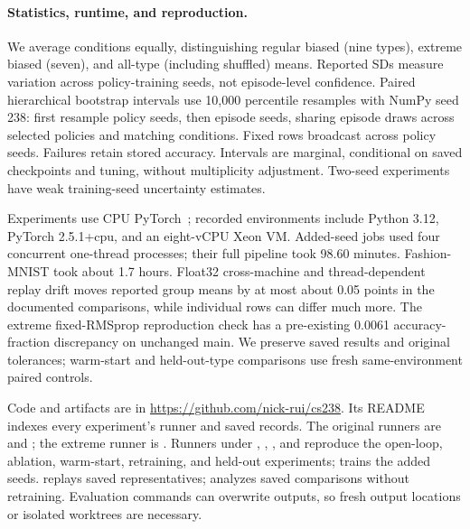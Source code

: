 \documentclass{article}
\begin{document}
\paragraph{Statistics, runtime, and reproduction.}
We average conditions equally, distinguishing regular biased (nine types), extreme biased (seven), and all-type (including shuffled) means. Reported SDs measure variation across policy-training seeds, not episode-level confidence. Paired hierarchical bootstrap intervals use 10,000 percentile resamples with NumPy seed 238: first resample policy seeds, then episode seeds, sharing episode draws across selected policies and matching conditions. Fixed rows broadcast across policy seeds. Failures retain stored accuracy. Intervals are marginal, conditional on saved checkpoints and tuning, without multiplicity adjustment. Two-seed experiments have weak training-seed uncertainty estimates.

Experiments use CPU PyTorch~\cite{paszke2019}; recorded environments include Python 3.12, PyTorch 2.5.1+cpu, and an eight-vCPU Xeon VM. Added-seed jobs used four concurrent one-thread processes; their full pipeline took 98.60 minutes. Fashion-MNIST took about 1.7 hours. Float32 cross-machine and thread-dependent replay drift moves reported group means by at most about 0.05 points in the documented comparisons, while individual rows can differ much more. The extreme fixed-RMSprop reproduction check has a pre-existing 0.0061 accuracy-fraction discrepancy on unchanged main. We preserve saved results and original tolerances; warm-start and held-out-type comparisons use fresh same-environment paired controls.

Code and artifacts are in \url{https://github.com/nick-rui/cs238}. Its README indexes every experiment's runner and saved records. The original runners are  and ; the extreme runner is . Runners under , , , and  reproduce the open-loop, ablation, warm-start, retraining, and held-out experiments;  trains the added seeds.  replays saved representatives;  analyzes saved comparisons without retraining. Evaluation commands can overwrite outputs, so fresh output locations or isolated worktrees are necessary.
\end{document}
